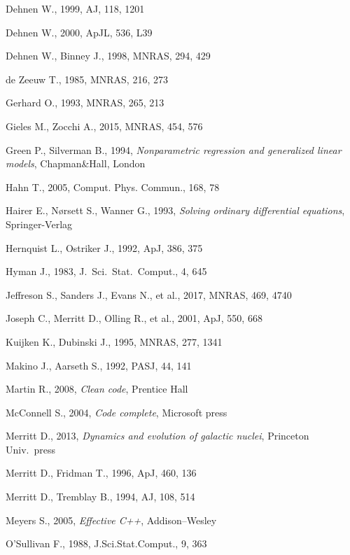 \documentclass[12pt]{article}
\begin{document}
\begin{thebibliography}{99}
Dehnen W., 1999, AJ, 118, 1201

Dehnen W., 2000, ApJL, 536, L39

Dehnen W., Binney J., 1998, MNRAS, 294, 429

de Zeeuw T., 1985, MNRAS, 216, 273

Gerhard O., 1993, MNRAS, 265, 213

Gieles M., Zocchi A., 2015, MNRAS, 454, 576

Green P., Silverman B., 1994, \textsl{Nonparametric regression and generalized linear models}, Chapman\&Hall, London

Hahn T., 2005, Comput. Phys. Commun., 168, 78

Hairer E., N{\o}rsett S., Wanner G., 1993, \textsl{Solving ordinary differential equations}, Springer-Verlag

Hernquist L., Ostriker J., 1992, ApJ, 386, 375

Hyman J., 1983, J.~Sci.~Stat.~Comput., 4, 645

Jeffreson S., Sanders J., Evans N., et al., 2017, MNRAS, 469, 4740

Joseph C., Merritt D., Olling R., et al., 2001, ApJ, 550, 668

Kuijken K., Dubinski J., 1995, MNRAS, 277, 1341

Makino J., Aarseth S., 1992, PASJ, 44, 141

Martin R., 2008, \textsl{Clean code}, Prentice Hall

McConnell S., 2004, \textsl{Code complete}, Microsoft press

Merritt D., 2013, \textsl{Dynamics and evolution of galactic nuclei}, Princeton Univ.\ press

Merritt D., Fridman T., 1996, ApJ, 460, 136

Merritt D., Tremblay B., 1994, AJ, 108, 514

Meyers S., 2005, \textsl{Effective C++}, Addison--Wesley

O'Sullivan F., 1988, J.Sci.Stat.Comput., 9, 363


\end{thebibliography}
\end{document}

